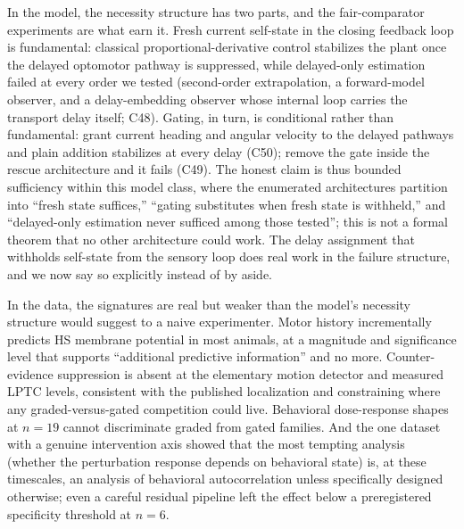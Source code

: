 \documentclass[pdflatex,sn-nature]{sn-jnl}
\begin{document}
In the model, the necessity structure has two parts, and the fair-comparator experiments are what earn it. Fresh current self-state in the closing feedback loop is fundamental: classical proportional-derivative control stabilizes the plant once the delayed optomotor pathway is suppressed, while delayed-only estimation failed at every order we tested (second-order extrapolation, a forward-model observer, and a delay-embedding observer whose internal loop carries the transport delay itself; C48). Gating, in turn, is conditional rather than fundamental: grant current heading and angular velocity to the delayed pathways and plain addition stabilizes at every delay (C50); remove the gate inside the rescue architecture and it fails (C49). The honest claim is thus bounded sufficiency within this model class, where the enumerated architectures partition into ``fresh state suffices,'' ``gating substitutes when fresh state is withheld,'' and ``delayed-only estimation never sufficed among those tested''; this is not a formal theorem that no other architecture could work. The delay assignment that withholds self-state from the sensory loop does real work in the failure structure, and we now say so explicitly instead of by aside.

In the data, the signatures are real but weaker than the model's necessity structure would suggest to a naive experimenter. Motor history incrementally predicts HS membrane potential in most animals, at a magnitude and significance level that supports ``additional predictive information'' and no more. Counter-evidence suppression is absent at the elementary motion detector and measured LPTC levels, consistent with the published localization and constraining where any graded-versus-gated competition could live. Behavioral dose-response shapes at $n=19$ cannot discriminate graded from gated families. And the one dataset with a genuine intervention axis showed that the most tempting analysis (whether the perturbation response depends on behavioral state) is, at these timescales, an analysis of behavioral autocorrelation unless specifically designed otherwise; even a careful residual pipeline left the effect below a preregistered specificity threshold at $n=6$.
\end{document}
